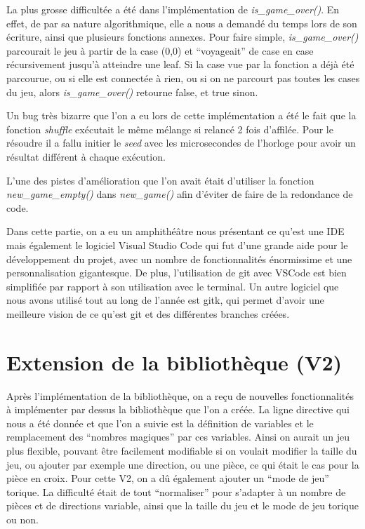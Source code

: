 ﻿\documentclass[12pt]{article}
\begin{document}
La plus grosse difficultée a été dans l’implémentation de \emph{is\_game\_over()}. En effet, de par sa nature algorithmique, elle a nous a demandé du temps lors de son écriture, ainsi que plusieurs fonctions annexes. Pour faire simple, \emph{is\_game\_over()} parcourait le jeu à partir de la case (0,0) et “voyageait” de case en case récursivement jusqu’à atteindre une leaf. Si la case vue par la fonction a déjà été parcourue, ou si elle est connectée à rien, ou si on ne parcourt pas toutes les cases du jeu, alors \emph{is\_game\_over()} retourne false, et true sinon.


Un bug très bizarre que l’on a eu lors de cette implémentation a été le fait que la fonction \emph{shuffle} exécutait le même mélange si relancé 2 fois d’affilée. Pour le résoudre il a fallu initier le \emph{seed} avec les microsecondes de l’horloge pour avoir un résultat différent à chaque exécution.


L’une des pistes d’amélioration que l’on avait était d’utiliser la fonction \emph{new\_game\_empty()} dans \emph{new\_game()} afin d’éviter de faire de la redondance de code.


Dans cette partie, on a eu un amphithéâtre nous présentant ce qu’est une IDE mais également le logiciel Visual Studio Code qui fut d’une grande aide pour le développement du projet, avec un nombre de fonctionnalités énormissime et une personnalisation gigantesque. De plus, l’utilisation de git avec VSCode est bien simplifiée par rapport à son utilisation avec le terminal.
Un autre logiciel que nous avons utilisé tout au long de l’année est gitk, qui permet d’avoir une meilleure vision de ce qu’est git et des différentes branches créées.


\section{Extension de la bibliothèque (V2)}


Après l’implémentation de la bibliothèque, on a reçu de nouvelles fonctionnalités à implémenter par dessus la bibliothèque que l’on a créée.
La ligne directive qui nous a été donnée et que l’on a suivie est la définition de variables et le remplacement des “nombres magiques” par ces variables. Ainsi on aurait un jeu plus flexible, pouvant être facilement modifiable si on voulait modifier la taille du jeu, ou ajouter par exemple une direction, ou une pièce, ce qui était le cas pour la pièce en croix.
Pour cette V2, on a dû également ajouter un “mode de jeu” torique.
La difficulté était de tout “normaliser” pour s’adapter à un nombre de pièces et de directions variable, ainsi que la taille du jeu et le mode de jeu torique ou non.
\end{document}
